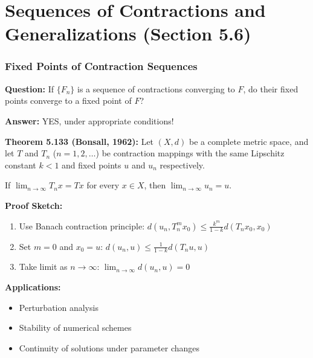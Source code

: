 \documentclass[aspectratio=169,10pt]{beamer}
\begin{document}
\section{Sequences of Contractions and Generalizations (Section 5.6)}

\begin{frame}
\frametitle{Fixed Points of Contraction Sequences}

\textbf{Question:} If $\{F_n\}$ is a sequence of contractions converging to $F$, do their fixed points converge to a fixed point of $F$?

\vspace{0.3cm}

\textbf{Answer:} YES, under appropriate conditions!

\vspace{0.3cm}

\textbf{Theorem 5.133 (Bonsall, 1962):} Let $(X, d)$ be a complete metric space, and let $T$ and $T_n$
($n = 1, 2, \ldots$) be contraction mappings with the same Lipschitz constant $k < 1$ and fixed points $u$ and $u_n$ respectively.

\vspace{0.2cm}

If $\lim_{n \to \infty} T_n x = T x$ for every $x \in X$, then $\lim_{n \to \infty} u_n = u$.

\vspace{0.3cm}

\textbf{Proof Sketch:}
\begin{enumerate}
    \item Use Banach contraction principle: $d(u_n, T_n^m x_0) \leq \frac{k^m}{1-k} d(T_n x_0, x_0)$
    \item Set $m = 0$ and $x_0 = u$: $d(u_n, u) \leq \frac{1}{1-k} d(T_n u, u)$
    \item Take limit as $n \to \infty$: $\lim_{n \to \infty} d(u_n, u) = 0$
\end{enumerate}

\vspace{0.3cm}

\textbf{Applications:}
\begin{itemize}
    \item Perturbation analysis
    \item Stability of numerical schemes
    \item Continuity of solutions under parameter changes
\end{itemize}

\end{frame}
\end{document}
